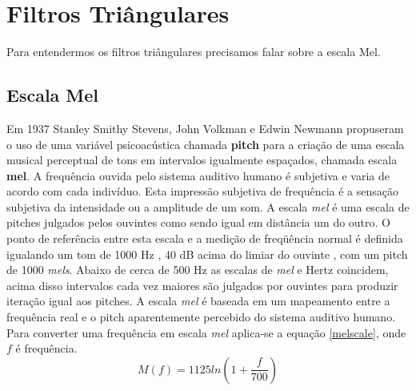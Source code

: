 \section{Filtros Triângulares}
\label{sec:filt:tri}
\quad Para entendermos os filtros triângulares precisamos falar sobre a escala Mel.

\subsection{Escala Mel}
\quad Em 1937 Stanley Smithy Stevens, John Volkman e Edwin Newmann propuseram o uso de uma variável psicoacústica chamada  \textbf {pitch}  para a criação de uma escala musical perceptual de tons em intervalos igualmente espaçados, chamada escala  \textbf {mel}. A frequência ouvida pelo sistema auditivo humano é subjetiva e varia de acordo com cada indivíduo. Esta impressão subjetiva de frequência é a sensação subjetiva da intensidade ou a amplitude de um som. A escala \textit{mel} é uma escala de pitches julgados pelos ouvintes como sendo igual em distância um do outro. O ponto de referência entre esta escala e a medição de freqüência normal é definida  igualando um tom de 1000 Hz , 40 dB acima do limiar do ouvinte , com um pitch de 1000 \textit{mels}. Abaixo de cerca de 500 Hz as escalas de \textit{mel} e Hertz coincidem, acima disso intervalos cada vez maiores são julgados por ouvintes para produzir iteração igual aos pitches. A escala \textit{mel} é baseada em um mapeamento entre a frequência real e o pitch aparentemente percebido do sistema auditivo humano. Para converter uma frequência em escala \textit{mel} aplica-se a equação \ref{melscale}, onde $f$ é frequência.
\begin{equation}
\label{melscale}
M(f) = 1125 ln(1 + \frac{f}{700})
\end{equation}


